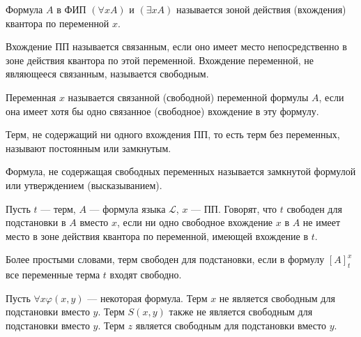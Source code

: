 
    \begin{Def}
        Формула $A$ в ФИП $(\forall x A)$ и $(\exists x A)$ называется зоной действия (вхождения) квантора по переменной $x$.
    \end{Def}

    \begin{Def} 
        Вхождение ПП называется связанным, если оно имеет место непосредственно в зоне действия квантора по этой переменной. Вхождение переменной, не являющееся связанным, называется свободным. 
        
        Переменная $x$ называется связанной (свободной) переменной формулы $A$, если она имеет хотя бы одно связанное (свободное) вхождение в эту формулу.
    \end{Def}

    \begin{Def}
        Терм, не содержащий ни одного вхождения ПП, то есть терм без переменных, называют постоянным или замкнутым.
    \end{Def}
    
    \begin{Def}
        Формула, не содержащая свободных переменных называется замкнутой формулой или утверждением (высказыванием).
    \end{Def}

    \begin{Def}
        Пусть $t$ --- терм, $A$ --- формула языка $\mathcal{L}$, $x$ --- ПП. Говорят, что $t$ свободен для подстановки в $A$ вместо $x$, если ни одно свободное вхождение $x$ в $A$ не имеет место в зоне действия квантора по переменной, имеющей вхождение в $t$.

        Более простыми словами, терм свободен для подстановки, если в формулу $[A]^x_t$ все переменные терма $t$ входят свободно.
    \end{Def}

    \begin{Example}
        Пусть $\forall x \varphi(x,y)$ --- некоторая формула. Терм $x$ не является свободным для подстановки вместо $y$. Терм $S(x, y)$ также не является свободным для подстановки вместо $y$. Терм $z$ является свободным для подстановки вместо $y$.
    \end{Example}
    

